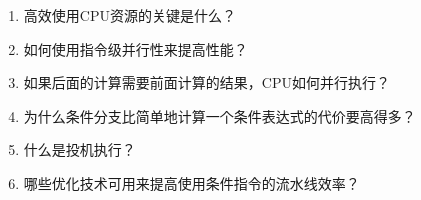 \begin{enumerate}
\item 高效使用CPU资源的关键是什么？
\item 如何使用指令级并行性来提高性能？
\item 如果后面的计算需要前面计算的结果，CPU如何并行执行？
\item 为什么条件分支比简单地计算一个条件表达式的代价要高得多？
\item 什么是投机执行？
\item 哪些优化技术可用来提高使用条件指令的流水线效率？
\end{enumerate}